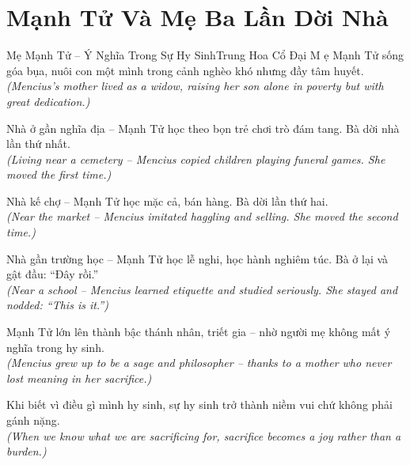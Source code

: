\section{Mạnh Tử Và Mẹ Ba Lần Dời Nhà}
\begin{truyen}{Mẹ Mạnh Tử -- Ý Nghĩa Trong Sự Hy Sinh}{Trung Hoa Cổ Đại}
M ẹ Mạnh Tử sống góa bụa, nuôi con một mình trong cảnh nghèo khó nhưng đầy tâm huyết.\\
\textit{(Mencius's mother lived as a widow, raising her son alone in poverty but with great dedication.)}

Nhà ở gần nghĩa địa -- Mạnh Tử học theo bọn trẻ chơi trò đám tang. Bà dời nhà lần thứ nhất.\\
\textit{(Living near a cemetery -- Mencius copied children playing funeral games. She moved the first time.)}

Nhà kế chợ -- Mạnh Tử học mặc cả, bán hàng. Bà dời lần thứ hai.\\
\textit{(Near the market -- Mencius imitated haggling and selling. She moved the second time.)}

Nhà gần trường học -- Mạnh Tử học lễ nghi, học hành nghiêm túc. Bà ở lại và gật đầu: ``Đây rồi.''\\
\textit{(Near a school -- Mencius learned etiquette and studied seriously. She stayed and nodded: ``This is it.'')}

Mạnh Tử lớn lên thành bậc thánh nhân, triết gia -- nhờ người mẹ không mất ý nghĩa trong hy sinh.\\
\textit{(Mencius grew up to be a sage and philosopher -- thanks to a mother who never lost meaning in her sacrifice.)}

\end{truyen}
\begin{baihoc}
  Khi biết vì điều gì mình hy sinh, sự hy sinh trở thành niềm vui chứ không phải gánh nặng.\\
  \textit{(When we know what we are sacrificing for, sacrifice becomes a joy rather than a burden.)}
\end{baihoc}

